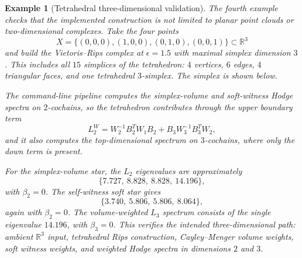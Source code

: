 \documentclass[11pt]{amsart}
\theoremstyle{plain}
\newtheorem{example}[theorem]{Example}
\begin{document}
\begin{example}[Tetrahedral three-dimensional validation]
The fourth example checks that the implemented construction is not limited to planar point clouds or
two-dimensional complexes. Take the four points
\[
X=\{(0,0,0),(1,0,0),(0,1,0),(0,0,1)\}\subset\mathbb{R}^3
\]
and build the Vietoris--Rips complex at $\epsilon=1.5$ with maximal simplex dimension $3$. This
includes all $15$ simplices of the tetrahedron: $4$ vertices, $6$ edges, $4$ triangular faces, and
one tetrahedral $3$-simplex. The simplex is shown below.
\begin{center}
\end{center}

The command-line pipeline computes the simplex-volume and soft-witness Hodge spectra on
$2$-cochains, so the tetrahedron contributes through the upper boundary term
\[
L_2^W
=
W_2^{-1}B_2^TW_1B_2 + B_3W_3^{-1}B_3^TW_2,
\]
and it also computes the top-dimensional spectrum on $3$-cochains, where only the down term is
present.

For the simplex-volume star, the $L_2$ eigenvalues are approximately
\[
\{7.727,\ 8.828,\ 8.828,\ 14.196\},
\]
with $\beta_2=0$. The self-witness soft star gives
\[
\{3.740,\ 5.806,\ 5.806,\ 8.064\},
\]
again with $\beta_2=0$. The volume-weighted $L_3$ spectrum consists of the single eigenvalue
$14.196$, with $\beta_3=0$. This verifies the intended three-dimensional path: ambient
$\mathbb{R}^3$ input, tetrahedral Rips construction, Cayley--Menger volume weights, soft witness
weights, and weighted Hodge spectra in dimensions $2$ and $3$.
\end{example}
\end{document}
